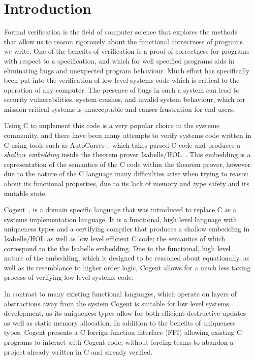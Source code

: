 \chapter{Introduction}\label{ch:intro}

Formal verification is the field of computer science that explores the methods that allow us to
  reason rigorously about the functional correctness of programs we write.
One of the benefits of verification is a proof of correctness for programs with respect to a specification,
  and which for well specified programs aids in eliminating bugs and unexpected program behaviour.
Much effort has specifically been put into the verification of low level systems code
  which is critical to the operation of any computer.
The presence of bugs in such a system can lead to security vulnerabilities,
  system crashes, and invalid system behaviour, which for mission critical systems is unacceptable and
  causes frustration for end users.

Using C to implement this code is a very popular choice in the systems community,
  and there have been many attempts to verify systems code written in C using tools such as 
  AutoCorres~\citep{AutoCorres}, which takes parsed C code and produces a \textit{shallow embedding}
  inside the theorem prover Isabelle/HOL~\citep{IsabelleTutorial}.
This embedding is a representation of the semantics of the C code within the theorem prover,
  however due to the nature of the C language many difficulties arise when trying to
  reason about its functional properties, due to its lack of memory and type safety 
  and its mutable state.

Cogent~\citep{ICFPCogent}, is a domain specific language that was introduced to replace C as a systems
  implementation language.
It is a functional, high level language with uniqueness types and a certifying compiler
  that produces a shallow embedding in Isabelle/HOL as well as low level efficient C code;
  the semantics of which correspond to the the Isabelle embedding.
Due to the functional, high level nature of the embedding,
  which is designed to be reasoned about equationally, as well as its resemblance to higher order logic,
  Cogent allows for a much less taxing process of verifying low level systems code.

In contrast to many existing functional languages, which operate
  on layers of abstractions away from the system Cogent is suitable for low level systems development,
  as its uniqueness types allow for both efficient destructive updates as well as static memory allocation.
In addition to the benefits of uniqueness types, Cogent presents a C foreign function interface (FFI) allowing existing C programs
 to interact with Cogent code, without forcing teams to abandon a project already written in C and already verified.

